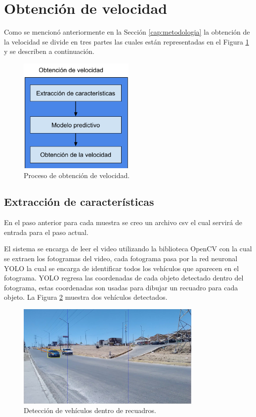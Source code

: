 \section{Obtención de velocidad}

Como se mencionó anteriormente en la Sección \ref{cap:metodologia} la obtención de la velocidad se divide en tres partes las cuales están representadas en el Figura \ref{fig:DFObtencionDeVelocidad} y se describen a continuación.

\begin{figure}[H]
    \centering
    \includegraphics[width=0.5\textwidth]{Metodologia/imgs/ObtencionVelocidad.png}
    \caption{Proceso de obtención de velocidad.}
    \label{fig:DFObtencionDeVelocidad}
\end{figure}

\subsection{Extracción de características }

En el paso anterior para cada muestra se creo un archivo csv el cual servirá de entrada para el paso actual.

El sistema se encarga de leer el video utilizando la biblioteca OpenCV con la cual se extraen los fotogramas del video, cada fotograma pasa por la red neuronal YOLO la cual se encarga de identificar todos los vehículos que aparecen en el fotograma. YOLO regresa las coordenadas de cada objeto detectado dentro del fotograma, estas coordenadas son usadas para dibujar un recuadro para cada objeto. La Figura \ref{fig:LugarDeteccion} muestra dos vehículos detectados.

\begin{figure}[H]
    \centering
    \includegraphics[width=0.8\textwidth]{Metodologia/imgs/Deteccion.jpg}
    \caption{Detección de vehículos dentro de recuadros.}
    \label{fig:LugarDeteccion}
\end{figure}

